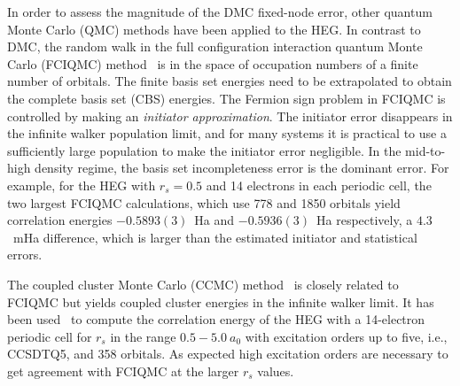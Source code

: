 
In order to assess the magnitude of the DMC fixed-node error, other quantum Monte Carlo (QMC) methods
have been applied to the HEG.
In contrast to DMC, the random walk in the full configuration interaction quantum Monte Carlo (FCIQMC)
method~\cite{BooThoAla-JCP-09,CleBooAla-JCP-10,SheBooAla-JCP-12,SheBooGruAla-PRB-12} is in the space of
occupation numbers of a finite number of orbitals.
The finite basis set energies need to be extrapolated to obtain the complete basis set (CBS) energies.
The Fermion sign problem in FCIQMC is controlled by making an {\it initiator approximation}.
The initiator error disappears in the infinite walker population limit, and for many systems it is practical
to use a sufficiently large population to make the initiator error negligible.
In the mid-to-high density regime, the basis set incompleteness error is the dominant error.
For example, for the HEG with $r_s=0.5$ and 14 electrons in each periodic cell, the two largest FCIQMC
calculations, which use 778 and 1850 orbitals yield correlation energies $-0.5893(3)$~Ha and $-0.5936(3)$~Ha
respectively, a $4.3$~mHa difference, which is larger than the estimated initiator and statistical errors.

The coupled cluster Monte Carlo (CCMC) method~\cite{Tho-PRL-10,neufeld2017study} is closely related
to FCIQMC but yields coupled cluster energies in the infinite walker limit.
It has been used~\cite{neufeld2017study} to compute the correlation energy of the HEG with a 14-electron periodic cell for
$r_s$ in the range $0.5 - 5.0\ a_0$ with excitation orders up to five, i.e., CCSDTQ5, and 358 orbitals.
As expected high excitation orders are necessary to get agreement with FCIQMC at the larger $r_s$ values.

